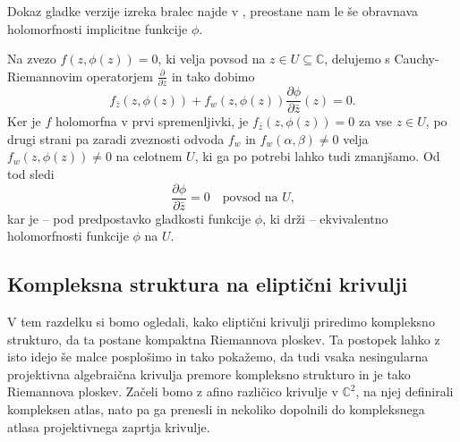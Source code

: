 \documentclass[mat1]{fmfdelo}
\numberwithin{equation}{section}
\newcommand{\C}{\mathbb C}
\newcommand{\pdv}[2][]{\frac{\partial#1}{\partial#2}}
\theoremstyle{definition}
\begin{document}
\begin{dokaz}
    Dokaz gladke verzije izreka bralec najde v \cite[Izrek 14]{Globevnik}, preostane nam le še obravnava holomorfnosti implicitne funkcije $\phi$.

    Na zvezo $f(z, \phi(z)) = 0$, ki velja povsod na $z \in U \subseteq \C$, delujemo s Cauchy-Riemannovim operatorjem $\pdv{\bar{z}}$ in tako dobimo
    \[
        f_{\bar{z}}(z, \phi(z)) + f_{w}(z, \phi(z)) \pdv[\phi]{\bar{z}}(z) = 0.  
    \] 
    Ker je $f$ holomorfna v prvi spremenljivki, je $f_{\bar{z}}(z, \phi(z)) = 0$ za vse $z \in U$, po drugi strani pa zaradi zveznosti odvoda $f_w$ in $f_w(\alpha, \beta) \neq 0$ velja $f_{w}(z, \phi(z)) \neq 0$ na celotnem $U$, ki ga po potrebi lahko tudi zmanjšamo. Od tod sledi
    \[
        \pdv[\phi]{\bar{z}} = 0 \quad \text {povsod na $U$,}  
    \]
    kar je -- pod predpostavko gladkosti funkcije $\phi$, ki drži -- ekvivalentno holomorfnosti funkcije $\phi$ na $U$. 
\end{dokaz}






\subsection{Kompleksna struktura na eliptični krivulji}
\label{Kompleksna struktura na elipticni krivulji}

V tem razdelku si bomo ogledali, kako eliptični krivulji 
priredimo kompleksno strukturo, da ta postane kompaktna Riemannova ploskev. Ta postopek lahko z isto idejo še malce posplošimo in tako pokažemo, da tudi vsaka nesingularna projektivna algebraična krivulja premore kompleksno strukturo in je tako Riemannova ploskev.   
Začeli bomo z afino različico krivulje v $\C^2$, na njej definirali kompleksen atlas, nato pa ga prenesli in nekoliko dopolnili do kompleksnega atlasa projektivnega zaprtja krivulje.
\end{document}
